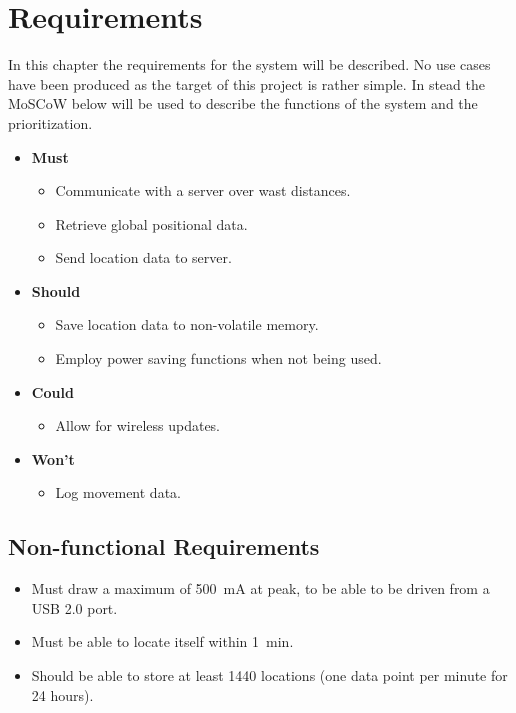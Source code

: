 
\chapter{Requirements}
\label{chap:requirements}
In this chapter the requirements for the system will be described.
No use cases have been produced as the target of this project is rather simple.
In stead the MoSCoW below will be used to describe the functions of the system and the prioritization.

\begin{itemize}
	\item \textbf{Must}
	\begin{itemize}
		\item Communicate with a server over wast distances.
		\item Retrieve global positional data.
		\item Send location data to server.
	\end{itemize}
	\item \textbf{Should}
	\begin{itemize}
		\item Save location data to non-volatile memory.
		\item Employ power saving functions when not being used.
	\end{itemize}
	\item \textbf{Could}
	\begin{itemize}
		\item Allow for wireless updates.
	\end{itemize}
	\item \textbf{Won't}
	\begin{itemize}
		\item Log movement data.
	\end{itemize}
\end{itemize}

\section{Non-functional Requirements}
\begin{itemize}
	\item Must draw a maximum of \SI{500}{\milli\ampere} at peak, to be able to be driven from a USB 2.0 port. 
	\item Must be able to locate itself within \SI{1}{\minute}.
	\item Should be able to store at least \num{1440} locations (one data point per minute for \num{24} hours).
\end{itemize}